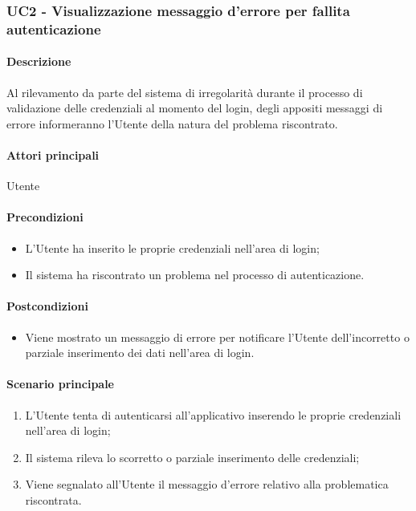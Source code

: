 \subsubsection{UC2 - Visualizzazione messaggio d'errore per fallita autenticazione}\label{UC2}
\paragraph*{Descrizione}
Al rilevamento da parte del sistema di irregolarità durante il processo di validazione delle credenziali al momento del login, degli appositi messaggi di errore informeranno l’Utente della natura del problema riscontrato.

\paragraph*{Attori principali}
Utente

\paragraph*{Precondizioni}
\begin{itemize}
  \item L’Utente ha inserito le proprie credenziali nell’area di login;
  \item Il sistema ha riscontrato un problema nel processo di autenticazione.  
\end{itemize}

\paragraph*{Postcondizioni}
\begin{itemize}
  \item Viene mostrato un messaggio di errore per notificare l’Utente dell’incorretto o parziale inserimento dei dati nell’area di login.
\end{itemize}

\paragraph*{Scenario principale}
\begin{enumerate}
  \item L’Utente tenta di autenticarsi all’applicativo inserendo le proprie credenziali nell’area di login;
  \item Il sistema rileva lo scorretto o parziale inserimento delle credenziali;
  \item Viene segnalato all’Utente il messaggio d’errore relativo alla problematica riscontrata.  
\end{enumerate}

